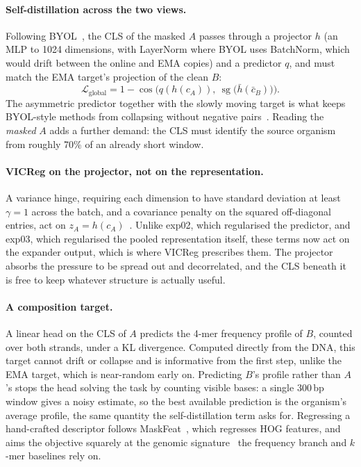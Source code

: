 \documentclass[10pt,twocolumn,a4paper]{article}
\begin{document}
\paragraph{Self-distillation across the two views.}
Following BYOL~\cite{grill2020byol}, the CLS of the masked $A$ passes through a
projector $h$ (an MLP to 1024 dimensions, with LayerNorm where BYOL uses
BatchNorm, which would drift between the online and EMA copies) and a predictor
$q$, and must match the EMA target's projection of the clean $B$:
\begin{equation}
\mathcal{L}_{\text{global}}
 = 1-\cos\!\bigl(q(h(c_A)),\ \operatorname{sg}\bigl(\bar h(\bar c_B)\bigr)\bigr).
\end{equation}
The asymmetric predictor together with the slowly moving target is what keeps
BYOL-style methods from collapsing without negative
pairs~\cite{tian2021understanding,chen2021simsiam}. Reading the \emph{masked}
$A$ adds a further demand: the CLS must identify the source organism from roughly
70\% of an already short window.

\paragraph{VICReg on the projector, not on the representation.}
A variance hinge, requiring each dimension to have standard deviation at least
$\gamma=1$ across the batch, and a covariance penalty on the squared off-diagonal
entries, act on $z_A=h(c_A)$~\cite{bardes2022vicreg}. Unlike exp02, which
regularised the predictor, and exp03, which regularised the pooled representation
itself, these terms now act on the expander output, which is where VICReg
prescribes them. The projector absorbs the pressure to be spread out and
decorrelated, and the CLS beneath it is free to keep whatever structure is
actually useful.

\paragraph{A composition target.}
A linear head on the CLS of $A$ predicts the 4-mer frequency profile of $B$,
counted over both strands, under a KL divergence. Computed directly from the DNA,
this target cannot drift or collapse and is informative from the first step,
unlike the EMA target, which is near-random early on. Predicting $B$'s profile
rather than $A$'s stops the head solving the task by counting visible bases: a
single 300\,bp window gives a noisy estimate, so the best available prediction is
the organism's average profile, the same quantity the self-distillation term asks
for. Regressing a hand-crafted descriptor follows
MaskFeat~\cite{wei2022maskfeat}, which regresses HOG features, and aims the
objective squarely at the genomic signature~\cite{karlin1995signature} the
frequency branch and $k$-mer baselines rely on.
\end{document}
